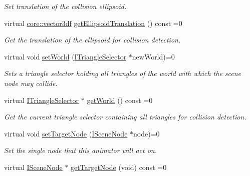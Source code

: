 \begin{DoxyCompactItemize}
\begin{DoxyCompactList}\small\item\em Set translation of the collision ellipsoid. \end{DoxyCompactList}\item 
virtual \hyperlink{namespaceirr_1_1core_ae6e2b2a6c552833ebbd5b7463d03586b}{core\+::vector3df} \hyperlink{classirr_1_1scene_1_1ISceneNodeAnimatorCollisionResponse_aff0a2ad6ff375a85e08a3226e3267286}{get\+Ellipsoid\+Translation} () const =0
\begin{DoxyCompactList}\small\item\em Get the translation of the ellipsoid for collision detection. \end{DoxyCompactList}\item 
virtual void \hyperlink{classirr_1_1scene_1_1ISceneNodeAnimatorCollisionResponse_a42aa84d4843a734f8dd1f20b5c92ef06}{set\+World} (\hyperlink{classirr_1_1scene_1_1ITriangleSelector}{I\+Triangle\+Selector} $\ast$new\+World)=0
\begin{DoxyCompactList}\small\item\em Sets a triangle selector holding all triangles of the world with which the scene node may collide. \end{DoxyCompactList}\item 
\mbox{\label{classirr_1_1scene_1_1ISceneNodeAnimatorCollisionResponse_a58e106171ca57a4877d7a6f0edd9762f}} 
virtual \hyperlink{classirr_1_1scene_1_1ITriangleSelector}{I\+Triangle\+Selector} $\ast$ \hyperlink{classirr_1_1scene_1_1ISceneNodeAnimatorCollisionResponse_a58e106171ca57a4877d7a6f0edd9762f}{get\+World} () const =0
\begin{DoxyCompactList}\small\item\em Get the current triangle selector containing all triangles for collision detection. \end{DoxyCompactList}\item 
virtual void \hyperlink{classirr_1_1scene_1_1ISceneNodeAnimatorCollisionResponse_a5b291ba9249c451779f76ab2154aa3c2}{set\+Target\+Node} (\hyperlink{classirr_1_1scene_1_1ISceneNode}{I\+Scene\+Node} $\ast$node)=0
\begin{DoxyCompactList}\small\item\em Set the single node that this animator will act on. \end{DoxyCompactList}\item 
virtual \hyperlink{classirr_1_1scene_1_1ISceneNode}{I\+Scene\+Node} $\ast$ \hyperlink{classirr_1_1scene_1_1ISceneNodeAnimatorCollisionResponse_a11b1c54ec705f4ba8b0bb3facb0f09cb}{get\+Target\+Node} (void) const =0

\end{DoxyCompactItemize}
